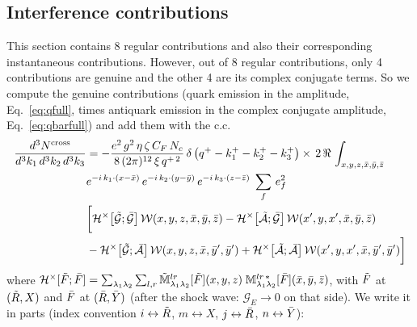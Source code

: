 \documentclass[9pt]{article}
\newcommand{\GE}{\mathcal{G}_{E}}            %
\newcommand{\M}{\mathbb{M}}
\newcommand{\Mq}{\Tilde{\mathbb{M}}}
\newcommand{\Hs}{\mathcal{H}}
\numberwithin{equation}{section}
\begin{document}
\subsection{Interference contributions}
This section contains 8 regular contributions and also their corresponding instantaneous contributions. However, out of 8 regular contributions, only 4 contributions are genuine and the other 4 are its complex conjugate terms. So we compute the genuine contributions (quark emission in the amplitude, Eq.~\eqref{eq:qfull}, times antiquark emission in the complex conjugate amplitude, Eq.~\eqref{eq:qbarfull}) and add them with the c.c.
\begin{align}
     \frac{d^{3}N^{\text{cross}}}{d^{3}k_{1}\,d^{3}k_{2}\, d^{3}k_{3}} & = -\frac{e^{2}\,g^{2}\,\eta\,\zeta\,C_{F}\,N_{c}}{8\, (2\pi)^{12}\,\xi\,q^{+\,2}}\, \delta\left(q^{+}-k^{+}_{1}-k^{+}_{2}-k^{+}_{3}\right)\times\, 2\,\Re\,\int_{x,y,z,\Bar{x},\Bar{y},\Bar{z}}\notag \\ & e^{-i\,k_{1}\cdot (x-\Bar{x})}\, e^{-i\,k_{2}\cdot (y-\Bar{y})}\, e^{-i\,k_{3}\cdot (z-\Bar{z})}\;\sum_{f}\,e^{2}_{f}\notag \\ & \bigg[\Hs^{\times}\!\left[\Tilde{\mathcal{G}};\Bar{\mathcal{G}}\right]\mathcal{W}(x,y,z,\Bar{x},\Bar{y},\Bar{z}) - \Hs^{\times}\!\left[\Tilde{\mathcal{A}};\Bar{\mathcal{G}}\right]\mathcal{W}(x',y,x',\Bar{x},\Bar{y},\Bar{z})\notag \\ & -\Hs^{\times}\!\left[\Tilde{\mathcal{G}};\Bar{\mathcal{A}}\right]\mathcal{W}(x,y,z,\Bar{x},\Bar{y}',\Bar{y}')+\Hs^{\times}\!\left[\Tilde{\mathcal{A}};\Bar{\mathcal{A}}\right]\mathcal{W}(x',y,x',\Bar{x},\Bar{y}',\Bar{y}')\bigg]
\end{align}
where $\Hs^{\times}[\Tilde{F};\Bar{F}] = \sum_{\lambda_{1}\lambda_{2}}\sum_{l,r}\Mq^{lr}_{\lambda_{1}\lambda_{2}}[\Tilde{F}](x,y,z)\;\M^{lr\,*}_{\lambda_{1}\lambda_{2}}[\Bar{F}](\Bar{x},\Bar{y},\Bar{z})$, with $\Tilde{F}$ at $(\Tilde{R},X)$ and $\Bar{F}$ at $(\Bar{R},\Bar{Y})$ (after the shock wave: $\GE\rightarrow 0$ on that side). We write it in parts (index convention $i\leftrightarrow\Tilde{R}$, $m\leftrightarrow X$, $j\leftrightarrow\Bar{R}$, $n\leftrightarrow\Bar{Y}$):
\end{document}
